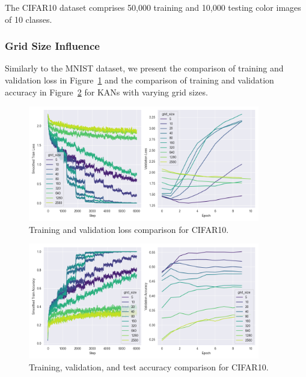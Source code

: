 \documentclass{article}
\begin{document}
The CIFAR10 dataset comprises 50,000 training and 10,000 testing color images of 10 classes.

\subsubsection{Grid Size Influence}\label{subsubsec:grid-size-influence-cifar10}

Similarly to the MNIST dataset, we present the comparison of training and validation loss in Figure~\ref{fig:cifar10_loss_grid_size}
and the comparison of training and validation accuracy in Figure~\ref{fig:cifar10_accuracy_grid_size} for KANs with varying grid sizes.

\begin{figure}[H]
    \centering
    \includegraphics[width=0.9\textwidth]{pics/cifar10_loss_grid_size}
    \caption{Training and validation loss comparison for CIFAR10.}
    \label{fig:cifar10_loss_grid_size}
\end{figure}

\begin{figure}[H]
    \centering
    \includegraphics[width=0.9\textwidth]{pics/cifar10_accuracy_grid_size}
    \caption{Training, validation, and test accuracy comparison for CIFAR10.}
    \label{fig:cifar10_accuracy_grid_size}
\end{figure}
\end{document}

